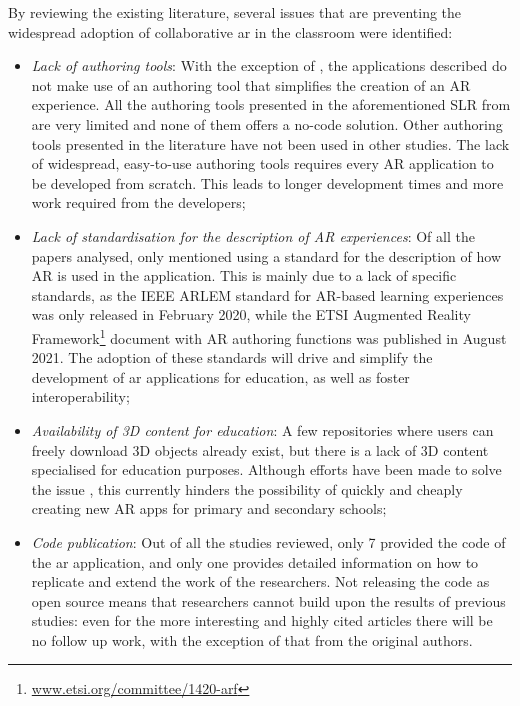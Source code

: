 By reviewing the existing literature, several issues that are preventing the widespread adoption of collaborative \gls{ar} in the classroom were identified:
\begin{itemize}
    \item \textit{Lack of authoring tools}: With the exception of \cite{lytridis2018artutor, whitlock2020mrcat, farella2021augmented, farella2022arete}, the applications described do not make use of an authoring tool that simplifies the creation of an AR experience. All the authoring tools presented in the aforementioned SLR from \cite{dengel2022review} are very limited and none of them offers a no-code solution. Other authoring tools presented in the literature \citep{rajaram2022paper, blattgerste2023trainar} have not been used in other studies. The lack of widespread, easy-to-use authoring tools requires every AR application to be developed from scratch. This leads to longer development times and more work required from the developers;
    \item \textit{Lack of standardisation for the description of AR experiences}: Of all the papers analysed, only \cite{farella2022arete} mentioned using a standard for the description of how AR is used in the application. This is mainly due to a lack of specific standards, as the IEEE ARLEM standard \citep{arlem2020} for AR-based learning experiences was only released in February 2020, while the ETSI Augmented Reality Framework\footnote{\url{www.etsi.org/committee/1420-arf}} document with AR authoring functions was published in August 2021. The adoption of these standards will drive and simplify the development of \gls{ar} applications for education, as well as foster interoperability;
    \item \textit{Availability of 3D content for education}: A few repositories where users can freely download 3D objects already exist, but there is a lack of 3D content specialised for education purposes. Although efforts have been made to solve the issue \citep{masneri2020work, deitke2023objaversexl}, this currently hinders the possibility of quickly and cheaply creating new AR apps for primary and secondary schools;
    \item \textit{Code publication}: Out of all the studies reviewed, only 7 provided the code of the \gls{ar} application, and only one \citep{wellmann2022open} provides detailed information on how to replicate and extend the work of the researchers. Not releasing the code as open source means that researchers cannot build upon the results of previous studies: even for the more interesting and highly cited articles there will be no follow up work, with the exception of that from the original authors.
\end{itemize}

